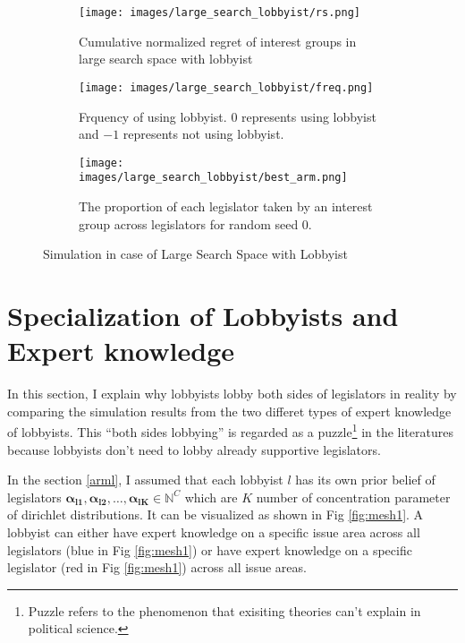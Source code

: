\documentclass{article}
\begin{document}
\begin{figure}[h!]
    \centering %
    \begin{subfigure}[b]{0.45\textwidth}
        
        \texttt{[image: images/large\_search\_lobbyist/rs.png]}
        
        \caption{Cumulative normalized regret of interest groups in large search space with lobbyist}
        \label{fig:rs_lb}
    \end{subfigure}
    \hfill
    \begin{subfigure}[b]{0.45\textwidth}
        \texttt{[image: images/large\_search\_lobbyist/freq.png]}
        \caption{Frquency of using lobbyist. $0$ represents using lobbyist and $-1$ represents 
        not using lobbyist.
        }
        \label{fig:lbproba}
    \end{subfigure}

    \begin{subfigure}[b]{1\columnwidth}
        \centering
        \texttt{[image: images/large\_search\_lobbyist/best\_arm.png]}
        \caption{The proportion of each legislator taken by an interest group across legislators for random seed $0$.}
        \label{fig:lbpropo}
    \end{subfigure}
    \caption{Simulation in case of Large Search Space with Lobbyist}
\end{figure}

\section{Specialization of Lobbyists and Expert knowledge}
In this section, I explain 
why lobbyists lobby both sides of legislators in reality
by comparing the simulation results from the two differet types of expert knowledge of lobbyists.
This ``both sides lobbying'' 
is regarded as a puzzle\footnote{Puzzle refers to the phenomenon that exisiting theories can't explain in political science. 
} in the literatures because lobbyists don't need to 
lobby already supportive legislators.


In the section \ref{arml}, I assumed 
that each lobbyist $l$ has its own prior belief of legislators $\mathbf{\alpha_{l1}}, \mathbf{\alpha_{l2}}, \hdots, \mathbf{\alpha_{lK}} \in \mathbb{N}^C$ which are $K$ number of concentration parameter of dirichlet distributions.
It can be visualized as shown in Fig \ref{fig:mesh1}. 
A lobbyist can either have expert knowledge 
on a specific issue area across all legislators (blue in Fig \ref{fig:mesh1}) or
have expert knowledge on a specific legislator (red in Fig \ref{fig:mesh1})
across all issue areas.
\end{document}
